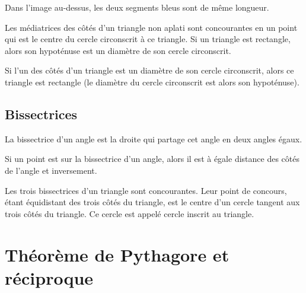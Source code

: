 \begin{exemple}
    Dans l'image au-dessus, les deux segments bleus sont de même longueur.
\end{exemple}

\begin{propriete}
    Les médiatrices des côtés d'un triangle non aplati sont concourantes en un point qui est le centre du cercle circonscrit à ce triangle. Si un triangle est rectangle, alors son hypoténuse est un diamètre de son cercle circonscrit.
\end{propriete}

\begin{propriete}
    Si l'un des côtés d'un triangle est un diamètre de son cercle circonscrit, alors ce triangle est rectangle (le diamètre du cercle circonscrit est alors son hypoténuse).
\end{propriete}

\subsection{Bissectrices}

\begin{definition}
    La bissectrice d'un angle est la droite qui partage cet angle en deux angles égaux.
\end{definition}

\begin{center}
\end{center}

\begin{propriete}
    Si un point est sur la bissectrice d'un angle, alors il est à égale distance des côtés de l'angle et inversement.
\end{propriete}

\begin{propriete}
    Les trois bissectrices d'un triangle sont concourantes. Leur point de concours, étant équidistant des trois côtés du triangle, est le centre d'un cercle tangent aux trois côtés du triangle. Ce cercle est appelé cercle inscrit au triangle.
\end{propriete}


\section{Théorème de Pythagore et réciproque}

